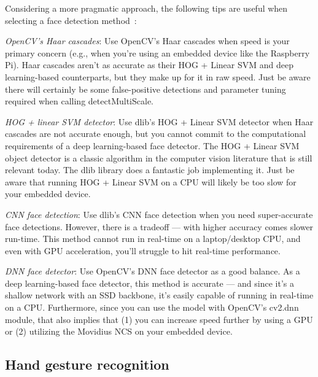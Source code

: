 Considering a more pragmatic approach, the following tips are useful when
selecting a face detection method~\cite{pyimage-face-bestpractices}:
\begin{enum-c}
\item \emph{OpenCV's Haar cascades}:
      Use OpenCV's Haar cascades when speed is your primary concern (e.g., when
      you're using an embedded device like the Raspberry Pi). Haar cascades
      aren't as accurate as their HOG + Linear SVM and deep learning-based
      counterparts, but they make up for it in raw speed. Just be aware there
      will certainly be some false-positive detections and parameter tuning
      required when calling detectMultiScale.
\item \emph{HOG + linear SVM detector}:
    Use dlib's HOG + Linear SVM detector when Haar cascades are not accurate
    enough, but you cannot commit to the computational requirements of a deep
    learning-based face detector. The HOG + Linear SVM object detector is a
    classic algorithm in the computer vision literature that is still relevant
    today. The dlib library does a fantastic job implementing it. Just be aware
    that running HOG + Linear SVM on a CPU will likely be too slow for your
    embedded device.
  \item \emph{CNN face detection}:
    Use dlib's CNN face detection when you need super-accurate face
    detections.
   However, there is a tradeoff — with
    higher accuracy comes slower run-time. This method cannot run in real-time
    on a laptop/desktop CPU, and even with GPU acceleration, you'll struggle to
    hit real-time performance.
  \item \emph{DNN face detector}:
    Use OpenCV's DNN face detector as a good balance. As a deep learning-based
    face detector, this method is accurate — and since it's a shallow network
    with an SSD backbone, it's easily capable of running in real-time on a
    CPU. Furthermore, since you can use the model with OpenCV's cv2.dnn module,
    that also implies that (1) you can increase speed further by using a GPU or
    (2) utilizing the Movidius NCS on your embedded device.
\end{enum-c}



\subsection{Hand gesture recognition}
\label{sec:hand-gest-recogn}


